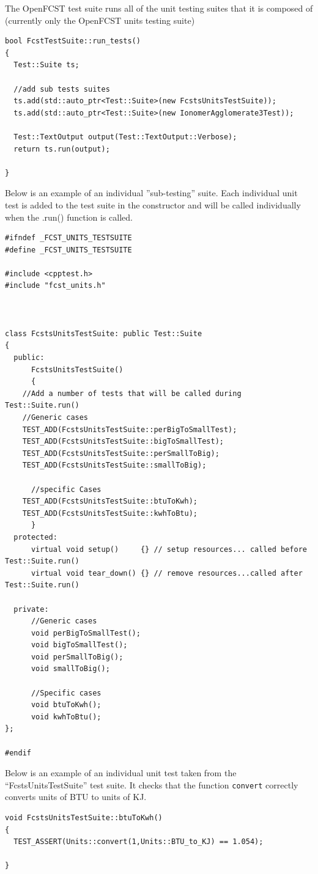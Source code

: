 The OpenFCST test suite runs all of the unit testing suites that it is composed of (currently only the OpenFCST units testing suite)
\begin{center}
\begin{lstlisting}
bool FcstTestSuite::run_tests()
{
  Test::Suite ts;

  //add sub tests suites
  ts.add(std::auto_ptr<Test::Suite>(new FcstsUnitsTestSuite));
  ts.add(std::auto_ptr<Test::Suite>(new IonomerAgglomerate3Test));		

  Test::TextOutput output(Test::TextOutput::Verbose);
  return ts.run(output);

} 
\end{lstlisting}
\end{center}
Below is an example of an individual ''sub-testing'' suite. Each individual unit test is added to the test suite in the constructor and will be called individually when the .run() function is called.
\begin{center}
\begin{lstlisting}
#ifndef _FCST_UNITS_TESTSUITE
#define _FCST_UNITS_TESTSUITE

#include <cpptest.h>
#include "fcst_units.h"



class FcstsUnitsTestSuite: public Test::Suite
{
  public:
      FcstsUnitsTestSuite()
      {
	//Add a number of tests that will be called during Test::Suite.run()
	//Generic cases
	TEST_ADD(FcstsUnitsTestSuite::perBigToSmallTest);
	TEST_ADD(FcstsUnitsTestSuite::bigToSmallTest);
	TEST_ADD(FcstsUnitsTestSuite::perSmallToBig);
	TEST_ADD(FcstsUnitsTestSuite::smallToBig);
	  
	  //specific Cases
	TEST_ADD(FcstsUnitsTestSuite::btuToKwh);
	TEST_ADD(FcstsUnitsTestSuite::kwhToBtu);
      }
  protected:
      virtual void setup()     {} // setup resources... called before Test::Suite.run()
      virtual void tear_down() {} // remove resources...called after Test::Suite.run()    
      
  private:
	  //Generic cases
      void perBigToSmallTest();
      void bigToSmallTest();
      void perSmallToBig();
      void smallToBig();
      
      //Specific cases
      void btuToKwh();
      void kwhToBtu();
}; 

#endif
\end{lstlisting}
\end{center}

Below is an example of an individual unit test taken from the ``FcstsUnitsTestSuite'' test suite. It checks that the function \texttt{convert} correctly converts units of BTU to units of KJ.
\begin{center}
\begin{lstlisting}
void FcstsUnitsTestSuite::btuToKwh()
{
  TEST_ASSERT(Units::convert(1,Units::BTU_to_KJ) == 1.054);

}
\end{lstlisting}
\end{center}

